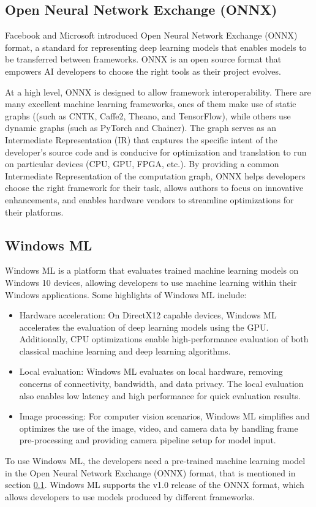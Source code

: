 \subsection{Open Neural Network Exchange (ONNX)}
\label{ssec:onnx}

Facebook and Microsoft introduced Open Neural Network Exchange (ONNX) format, a standard for representing deep learning models that enables models to be transferred between frameworks. ONNX is an open source format that empowers AI developers to choose the right tools as their project evolves.

At a high level, ONNX is designed to allow framework interoperability. There are many excellent machine learning frameworks, ones of them make use of static graphs ((such as CNTK, Caffe2, Theano, and TensorFlow), while others use dynamic graphs (such as PyTorch and Chainer). The graph serves as an Intermediate Representation (IR) that captures the specific intent of the developer's source code and is conducive for optimization and translation to run on particular devices (CPU, GPU, FPGA, etc.).  By providing a common Intermediate Representation of the computation graph, ONNX helps developers choose the right framework for their task, allows authors to focus on innovative enhancements, and enables hardware vendors to streamline optimizations for their platforms.

\subsection{Windows ML}

Windows ML is a platform that evaluates trained machine learning models on Windows 10 devices, allowing developers to use machine learning within their Windows applications. Some highlights of Windows ML include:

\begin{itemize}
\item Hardware acceleration: On DirectX12 capable devices, Windows ML accelerates the evaluation of deep learning models using the GPU. Additionally, CPU optimizations enable high-performance evaluation of both classical machine learning and deep learning algorithms.
\item Local evaluation: Windows ML evaluates on local hardware, removing concerns of connectivity, bandwidth, and data privacy. The local evaluation also enables low latency and high performance for quick evaluation results.
\item Image processing: For computer vision scenarios, Windows ML simplifies and optimizes the use of the image, video, and camera data by handling frame pre-processing and providing camera pipeline setup for model input.
\end{itemize}

To use Windows ML, the developers need a pre-trained machine learning model in the Open Neural Network Exchange (ONNX) format, that is mentioned in section \ref{ssec:onnx}. Windows ML supports the v1.0 release of the ONNX format, which allows developers to use models produced by different frameworks.
